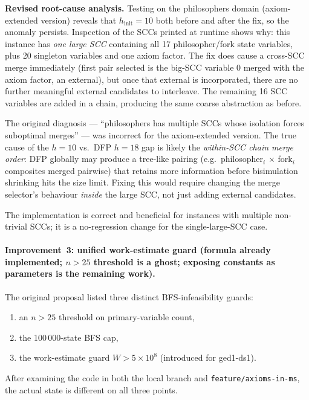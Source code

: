 \documentclass[11pt,a4paper]{article}
\begin{document}
\textbf{Revised root-cause analysis.}
Testing on the philosophers domain (axiom-extended version) reveals that
$h_{\mathrm{init}} = 10$ both before and after the fix, so the anomaly
persists.  Inspection of the SCCs printed at runtime shows why: this instance
has \emph{one large SCC} containing all 17 philosopher/fork state variables,
plus 20 singleton variables and one axiom factor.  The fix does cause a
cross-SCC merge immediately (first pair selected is the big-SCC variable 0
merged with the axiom factor, an external), but once that external is
incorporated, there are no further meaningful external candidates to
interleave.  The remaining 16 SCC variables are added in a chain, producing
the same coarse abstraction as before.

The original diagnosis --- ``philosophers has multiple SCCs whose isolation
forces suboptimal merges'' --- was incorrect for the axiom-extended version.
The true cause of the $h = 10$ vs.\ DFP $h = 18$ gap is likely the
\emph{within-SCC chain merge order}: DFP globally may produce a tree-like
pairing (e.g.\ philosopher$_i$ $\times$ fork$_i$ composites merged pairwise)
that retains more information before bisimulation shrinking hits the size
limit.  Fixing this would require changing the merge selector's behaviour
\emph{inside} the large SCC, not just adding external candidates.

The implementation is correct and beneficial for instances with multiple
non-trivial SCCs; it is a no-regression change for the single-large-SCC case.

\paragraph{Improvement~3: unified work-estimate guard
(formula already implemented; $n>25$ threshold is a ghost; exposing constants
as parameters is the remaining work).}

The original proposal listed three distinct BFS-infeasibility guards:
\begin{enumerate}
\item an $n > 25$ threshold on primary-variable count,
\item the 100\,000-state BFS cap,
\item the work-estimate guard $W > 5\times10^8$ (introduced for ged1-ds1).
\end{enumerate}
After examining the code in both the local branch and
\texttt{feature/axioms-in-ms}, the actual state is different on all three
points.
\end{document}

